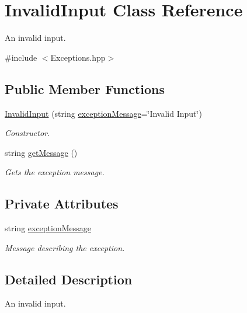 \hypertarget{class_invalid_input}{}\section{Invalid\+Input Class Reference}
\label{class_invalid_input}


An invalid input.  




{\ttfamily \#include $<$Exceptions.\+hpp$>$}

\subsection*{Public Member Functions}
\begin{DoxyCompactItemize}
\item 
\hyperlink{class_invalid_input_a0b7eb468e727adcd94e87e5a8c0cf716}{Invalid\+Input} (string \hyperlink{class_invalid_input_a0b76d2656afecfe458b1cc1a87dd98c9}{exception\+Message}=\char`\"{}Invalid Input\char`\"{})
\begin{DoxyCompactList}\small\item\em Constructor. \end{DoxyCompactList}\item 
string \hyperlink{class_invalid_input_abe61234c3ad05ac96a76f6adbba4b377}{get\+Message} ()
\begin{DoxyCompactList}\small\item\em Gets the exception message. \end{DoxyCompactList}\end{DoxyCompactItemize}
\subsection*{Private Attributes}
\begin{DoxyCompactItemize}
\item 
string \hyperlink{class_invalid_input_a0b76d2656afecfe458b1cc1a87dd98c9}{exception\+Message}
\begin{DoxyCompactList}\small\item\em Message describing the exception. \end{DoxyCompactList}\end{DoxyCompactItemize}


\subsection{Detailed Description}
An invalid input. 


